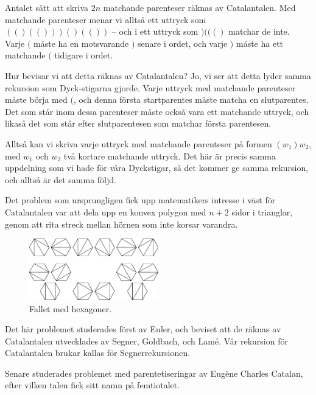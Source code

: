 \documentclass[nobib]{tufte-handout}
\begin{document}
\begin{example}
    Antalet sätt att skriva $2n$ matchande parenteser räknas av Catalantalen. Med matchande parenteser menar vi alltså ett uttryck som $(()(()))()(())$ -- och i ett uttryck som $)((()$ matchar de inte. Varje $($ måste ha en motsvarande $)$ senare i ordet, och varje $)$ måste ha ett matchande $($ tidigare i ordet.

    Hur bevisar vi att detta räknas av Catalantalen? Jo, vi ser att detta lyder samma rekursion som Dyck-stigarna gjorde. Varje uttryck med matchande parenteser måste börja med $($, och denna första startparentes måste matcha en slutparentes. Det som står inom dessa parenteser måste också vara ett matchande uttryck, och likaså det som står efter slutparentesen som matchar första parentesen.

    Alltså kan vi skriva varje uttryck med matchande parenteser på formen $(w_1)w_2$, med $w_1$ och $w_2$ två kortare matchande uttryck. Det här är precis samma uppdelning som vi hade för våra Dyckstigar, så det kommer ge samma rekursion, och alltså är det samma följd.
\end{example}

\begin{example}\label{example_polygons}
    Det problem som ursprungligen fick upp matematikers intresse i väst för Catalantalen var att dela upp en konvex polygon med $n+2$ sidor i trianglar, genom att rita streck mellan hörnen som inte korsar varandra.

    \begin{figure}
        \centering
        \includegraphics[width = 0.5\textwidth]{graphics/Catalan-Hexagons-example.pdf}
        \caption{Fallet med hexagoner.}
    \end{figure}

    Det här problemet studerades först av Euler, och beviset att de räknas av Catalantalen utvecklades av Segner, Goldbach, och Lamé. Vår rekursion för Catalantalen brukar kallas för Segnerrekursionen.

    Senare studerades problemet med parentetiseringar av Eugène Charles Catalan, efter vilken talen fick sitt namn på femtiotalet.
\end{example}
\end{document}
